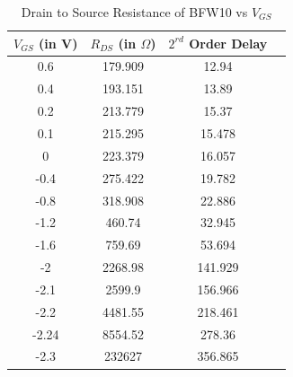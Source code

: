 \documentclass[]{risa}
\begin{document}
\begin{table}[H]
    \centering
    \caption{Drain to Source Resistance of BFW10 vs $V_{GS}$}
\begin{tabular}{|c|c|c|c|}
\hline
$V_{GS}$ (in V) & $R_{DS}$ (in $\Omega$) &  $2^{rd}$ Order Delay \\
\hline
0.6 & 179.909 & 12.94 \\
0.4 & 193.151 & 13.89 \\
0.2 & 213.779 & 15.37 \\
0.1 & 215.295 & 15.478 \\
0 & 223.379 & 16.057 \\
-0.4 & 275.422 & 19.782 \\
-0.8 & 318.908 & 22.886 \\
-1.2 & 460.74 & 32.945 \\
-1.6 & 759.69 & 53.694 \\
-2 & 2268.98 & 141.929 \\
-2.1 & 2599.9 & 156.966 \\
-2.2 & 4481.55 & 218.461 \\
-2.24 & 8554.52 & 278.36 \\
-2.3 & 232627 & 356.865 \\
\hline
\end{tabular}
    \label{tab:Rds_vs_Vgs}
\end{table}
\end{document}
